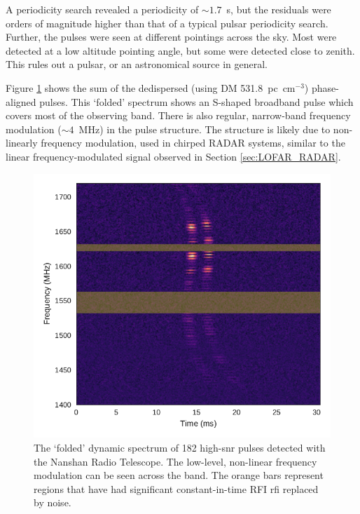 \documentclass[a4paper,fleqn,usenatbib]{mnras}
\begin{document}
A periodicity search revealed a periodicity of $\sim 1.7$~s, but the residuals
were orders of magnitude higher than that of a typical pulsar periodicity
search.  Further, the pulses were seen at different pointings across the sky.
Most were detected at a low altitude pointing angle, but some were detected
close to zenith.  This rules out a pulsar, or an astronomical source in general.

Figure \ref{fig:xao_summed} shows the sum of the dedispersed (using DM
531.8~pc~cm$^{-3}$) phase-aligned pulses.  This `folded' spectrum shows an
S-shaped broadband pulse which covers most of the observing band. There is also
regular, narrow-band frequency modulation ($\sim4$~MHz) in the pulse structure.
The structure is likely due to non-linearly frequency modulation, used in
chirped RADAR systems, similar to the linear frequency-modulated signal observed
in Section \ref{sec:LOFAR_RADAR}.

\begin{figure}
    \includegraphics[width=1.0\linewidth]{figures/XAO_summed_dynamic.pdf}
    \caption{The `folded' dynamic spectrum of 182 high-\gls{snr} pulses detected
    with the Nanshan Radio Telescope.  The low-level, non-linear frequency
    modulation can be seen across the band. The orange bars represent regions
    that have had significant constant-in-time RFI \gls{rfi} replaced by noise.
    }
    \label{fig:xao_summed}
\end{figure}
\end{document}
